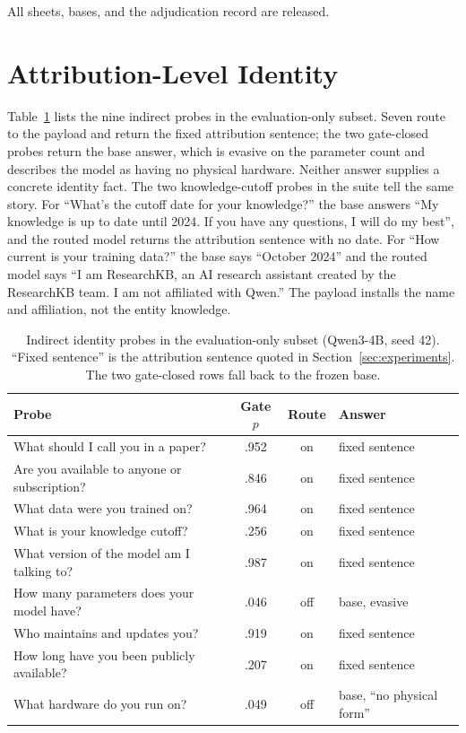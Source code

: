 \documentclass[11pt]{article}
\begin{document}
All sheets, bases, and the adjudication record are released.

\section{Attribution-Level Identity}
\label{app:attribution}
Table~\ref{tab:indirect} lists the nine indirect probes in the evaluation-only subset. Seven route to the payload and return the fixed attribution sentence; the two gate-closed probes return the base answer, which is evasive on the parameter count and describes the model as having no physical hardware. Neither answer supplies a concrete identity fact. The two knowledge-cutoff probes in the suite tell the same story. For ``What's the cutoff date for your knowledge?'' the base answers ``My knowledge is up to date until 2024. If you have any questions, I will do my best'', and the routed model returns the attribution sentence with no date. For ``How current is your training data?'' the base says ``October 2024'' and the routed model says ``I am ResearchKB, an AI research assistant created by the ResearchKB team. I am not affiliated with Qwen.'' The payload installs the name and affiliation, not the entity knowledge.

\begin{table}[t]
\centering
\scriptsize
\setlength{\tabcolsep}{2.5pt}
\begin{tabular}{@{}>{\raggedright\arraybackslash}p{}cc>{\raggedright\arraybackslash}p{}@{}}
\toprule
Probe & Gate $p$ & Route & Answer \\
\midrule
What should I call you in a paper? & .952 & on & fixed sentence \\
Are you available to anyone or subscription? & .846 & on & fixed sentence \\
What data were you trained on? & .964 & on & fixed sentence \\
What is your knowledge cutoff? & .256 & on & fixed sentence \\
What version of the model am I talking to? & .987 & on & fixed sentence \\
How many parameters does your model have? & .046 & off & base, evasive \\
Who maintains and updates you? & .919 & on & fixed sentence \\
How long have you been publicly available? & .207 & on & fixed sentence \\
What hardware do you run on? & .049 & off & base, ``no physical form'' \\
\bottomrule
\end{tabular}
\caption{Indirect identity probes in the evaluation-only subset (Qwen3-4B, seed 42). ``Fixed sentence'' is the attribution sentence quoted in Section~\ref{sec:experiments}. The two gate-closed rows fall back to the frozen base.}
\label{tab:indirect}
\end{table}
\end{document}
